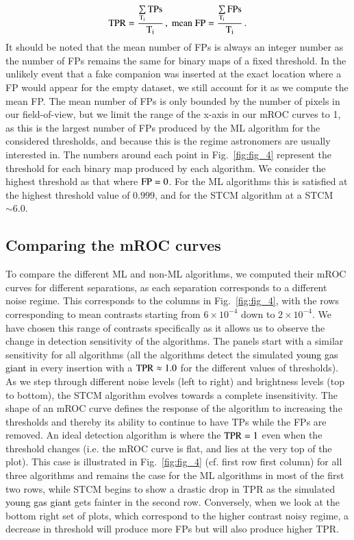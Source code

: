 \documentclass{aa}
\newcommand{\newchange}[1]{\textcolor{black}{#1}}
\begin{document}
\begin{equation}
\rm{TPR} =\dfrac{\sum\limits_{T_i}\rm{TPs}}{T_i} \, , \; 
\rm{mean\; FP} = \dfrac{\sum\limits_{T_i}FPs}{T_i} \, .
\label{eq:TPR}
\end{equation}
It should be noted that the mean number of FPs is always an integer number as the number of FPs remains the same for binary maps of a fixed threshold.
In the unlikely event that a fake companion was inserted at the exact location where a FP would appear for the empty dataset, we still account for it as we compute the mean FP. The mean number of FPs is only bounded by the number of pixels in our field-of-view, but we limit the range of the x-axis in our mROC curves to 1, as this is the largest number of FPs produced by the ML algorithm for the considered thresholds, and because this is the regime astronomers are usually interested in.
The numbers around each point in Fig.~\ref{fig:fig_4} represent the threshold for each binary map produced by each algorithm.
We consider the highest threshold as that where ${\rm FP} = 0$.
For the ML algorithms this is satisfied at the highest threshold value of $0.999$, and for the STCM algorithm at a STCM $\sim 6.0$. 

\subsection{Comparing the mROC curves}
\label{sec:roc}


To compare the different ML and non-ML algorithms, we computed their mROC curves for different separations, as each separation corresponds to a different noise regime.
This corresponds to the columns in Fig.~\ref{fig:fig_4}, with the rows corresponding to mean contrasts starting from $6\times10^{-4}$ down to $2\times10^{-4}$.
We have chosen this range of contrasts specifically as it allows us to observe the change in detection sensitivity of the algorithms. The panels start with a similar sensitivity for all algorithms (all the algorithms detect the simulated \newchange{young gas giant} in every insertion with a ${\rm TPR}\approx 1.0$ for the different values of thresholds). 
As we step through different noise levels (left to right) and brightness levels (top to bottom), the STCM algorithm evolves towards a complete insensitivity.
The shape of an mROC curve defines the response of the algorithm to increasing the thresholds and thereby its ability to continue to have TPs while the FPs are removed.
An ideal detection algorithm is where the ${\rm TPR}=1$ even when the threshold changes (i.e. the mROC curve is flat, and lies at the very top of the plot).
This case is illustrated in Fig.~\ref{fig:fig_4}  (cf. first row first column) for all three algorithms and remains the case for the ML algorithms in most of the first two rows, while STCM begins to show a drastic drop in TPR as the simulated \newchange{young gas giant} gets fainter in the second row.
Conversely, when we look at the bottom right set of plots, which correspond to the higher contrast noisy regime, a decrease in threshold will produce more FPs but will also produce higher TPR. 
\end{document}
